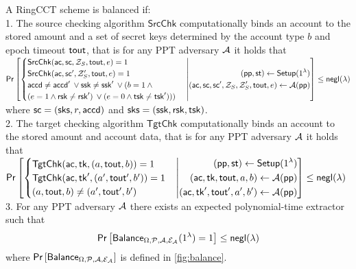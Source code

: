 \begin{definition}[Balance] A RingCCT scheme is balanced if: \\
1. The source checking algorithm $\mathsf{SrcChk}$ computationally binds an account to the stored amount and a set of secret keys determined by the account type $b$ and epoch timeout $\mathsf{tout}$, that is for any PPT adversary $\mathcal{A}$ it holds that 
\vspace{0.3cm} \\
$\mathsf{Pr}\left[
    \begin{cases} 
	\mathsf{SrcChk}(\ac, \mathsf{sc}, \mathcal{Z}_{S}, \tout, \expired) = 1 \tabularnewline
	\mathsf{SrcChk}(\ac, \mathsf{sc}', \mathcal{Z}_{S}', \tout, \expired) = 1 \tabularnewline
	\accd \neq \accd' \: \lor \ssk \neq \ssk' \: \lor (b = 1  \: \land \tabularnewline
        (e = 1 \land \rsk \neq \rsk') \: \lor (e = 0 \land \tsk \neq \tsk'))) \: \tabularnewline
    \end{cases} 
    \middle|
    \begin{aligned}
	(\pp, \st) \gets \mathsf{Setup}(1^\lambda) \\
	(\ac,  \mathsf{sc}, \mathsf{sc}', \mathcal{Z}_{S}, \mathcal{Z}_{S}', \tout, \expired) \gets \mathcal{A}(\pp) \\
    \end{aligned}
\right]
\leq \negl
\vspace{0.2cm} \\
$ where $\mathsf{sc} = (\mathsf{sks}, r, \mathsf{accd})$ and $\mathsf{sks} = (\mathsf{ssk}, \mathsf{rsk}, \mathsf{tsk})$. \vspace{0.3cm} \\
2. The target checking algorithm $\mathsf{TgtChk}$ computationally binds an account to the stored amount and account data, that is for any PPT adversary $\mathcal{A}$ it holds that
\vspace{0.3cm} \\
$\mathsf{Pr}\left[
    \begin{cases} 
	\mathsf{TgtChk}(\ac, \mathsf{tk}, (a, \tout, b)) = 1 \tabularnewline
	\mathsf{TgtChk}(\ac, \mathsf{tk}', (a', \tout', b')) = 1 \tabularnewline
	(a, \tout, b) \neq (a', \tout', b')
    \end{cases} 
    \middle|
    \begin{aligned}
	(\pp, \st) \gets \mathsf{Setup}(1^\lambda) \\
	(\ac, \mathsf{tk}, \tout, a, b) \gets \mathcal{A}(\pp) \\
	(\ac, \mathsf{tk}', \tout', a', b') \gets \mathcal{A}(\pp) \\
    \end{aligned}
\right]
\leq \negl
$ 
\vspace{0.3cm} \\
3. For any PPT adversary $\mathcal{A}$ there exists an expected polynomial-time extractor such that
\begin{equation*}
\mathsf{Pr}\left[\mathsf{Balance}_{\Omega,\mathcal{P},\adv,\mathcal{E}_\adv}(1^\lambda) = 1\right] \leq \negl
\end{equation*}
where $\mathsf{Pr}\left[\mathsf{Balance}_{\Omega,\mathcal{P},\mathcal{A},\mathcal{E}_{\mathcal{A}}}\right]$ is defined in \cref{fig:balance}.\\
\end{definition}

